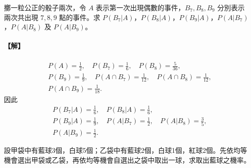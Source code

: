 \medskip
\begin{example}\label{ex:b5-4-7}
擲一粒公正的骰子兩次，令 $A$ 表示第一次出現偶數的事件，$B_7, B_8, B_9$ 分別表示兩次共出現 $7, 8, 9$ 點的事件。求 $P(B_7|A)$，$P(B_8|A)$，$P(B_9|A)$，$P(A|B_7)$，$P(A|B_8)$ 及 $P(A|B_9)$。
\end{example}
\paragraph{【解】}
\begin{align*}
&P(A) = \frac{1}{2}, \quad P(B_7) = \frac{1}{6}, \quad P(B_8) = \frac{5}{36}, \\
&P(B_9) = \frac{1}{9}, \quad P(A \cap B_7) = \frac{1}{12}, \quad P(A \cap B_8) = \frac{1}{12}, \\
&P(A \cap B_9) = \frac{1}{18}.
\end{align*}
因此
\begin{align*}
&P(B_7|A) = \frac{1}{6}, \quad P(B_8|A) = \frac{1}{6}, \\
&P(B_9|A) = \frac{1}{9}, \quad P(A|B_7) = \frac{1}{2}, \quad P(A|B_8) = \frac{3}{5}, \\
&P(A|B_9) = \frac{1}{2}. \tag*{\#}
\end{align*}

\medskip
\begin{discussion}\label{disc:b5-4-5}
設甲袋中有藍球3個，白球5個；乙袋中有藍球2個，白球1個，紅球2個。先依均等機會選出甲袋或乙袋，再依均等機會自選出之袋中取出一球，求取出藍球之機率。
\end{discussion}
